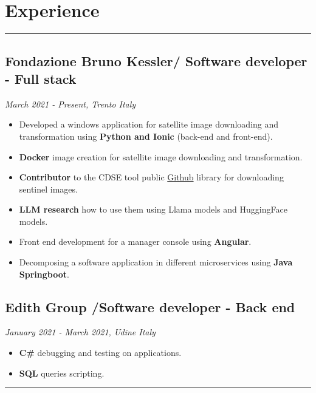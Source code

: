 \documentclass[a4paper,10pt]{article}
\begin{document}
\begin{minipage}[t]{0.25\textwidth}
    \section*{Experience}
    \vspace{7.3cm} %
    \rule{0.6cm}{0.3mm}
\end{minipage}
\hfill
\begin{minipage}[t]{0.75\textwidth}
     \subsection*{Fondazione Bruno Kessler/ Software developer - Full stack}
    \textit{ March 2021 - Present, Trento Italy  } \\
    \begin{itemize}[leftmargin=1cm]
        \item Developed a windows application for satellite image downloading and transformation using \textbf{Python and Ionic} (back-end and front-end).
        \item \textbf{Docker} image creation for satellite image downloading and transformation.
        \item \textbf{Contributor} to the CDSE tool public \href{https://github.com/CDSETool/CDSETool}{Github} library for downloading sentinel images.
        \item \textbf{LLM research} how to use them using Llama models and HuggingFace models.
        \item Front end development for a manager console using \textbf{Angular}.
        \item Decomposing a software application in different microservices using \textbf{Java Springboot}.
    \end{itemize}
    \vspace{0.2cm} %
    \subsection*{Edith Group /Software developer - Back end}
    \textit{January 2021 - March 2021, Udine Italy} \\
    \begin{itemize}[leftmargin=1cm]
        \item \textbf{C\#} debugging and testing on applications.
        \item \textbf{SQL} queries scripting.
    \end{itemize}
    \rule{\linewidth}{0.5mm}
\end{minipage}
\end{document}
